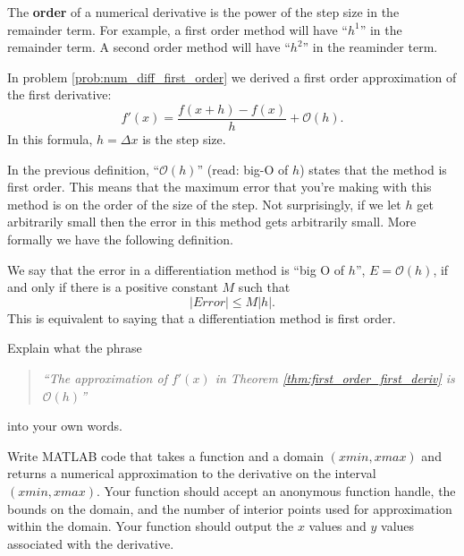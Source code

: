 \begin{definition}
    The {\bf order} of a numerical derivative is the power of the step size in the
    remainder term.  For example, a first order method will have ``$h^1$'' in the
    remainder term.  A second order method will have ``$h^2$'' in the reaminder term.
\end{definition}

\begin{thm}\label{thm:first_order_first_deriv}
    In problem \ref{prob:num_diff_first_order} we derived a first order approximation of
    the first derivative:
    \[ f'(x) = \frac{f(x+h) - f(x)}{h} + \mathcal{O}(h). \]
    In this formula, $h = \Delta x$ is the step size.
\end{thm}
In the previous definition, ``$\mathcal{O}(h)$'' (read: big-O of $h$) states that the
method is first order.  This means that the maximum error that you're making with this
method is on the order of the size of the step.  Not surprisingly, if we let $h$ get
arbitrarily small then the error in this method gets arbitrarily small.  More formally we
have the following definition.

\begin{definition}
    We say that the error in a differentiation method is ``big O of $h$'', $E =
    \mathcal{O}(h)$, if and only if there is a positive constant $M$ such that 
    \[ |Error| \le M |h|. \]
    This is equivalent to saying that a differentiation method is first order.
\end{definition}

\begin{problem}
    Explain what the phrase
    \begin{quote}
        {\it ``The approximation of $f'(x)$ in Theorem \ref{thm:first_order_first_deriv} is $\mathcal{O}(h)$''}
    \end{quote}
    into your own words.  
\end{problem}

\begin{problem}
    Write MATLAB code that takes a function and a domain $(xmin,xmax)$ and
    returns a numerical approximation to the derivative on the interval
    $(xmin,xmax)$. Your function should accept an anonymous function handle, the
    bounds on the domain, and the number of interior points used for approximation within
    the domain.  Your function should output the $x$ values and $y$ values associated with
    the derivative.\\
\end{problem}


